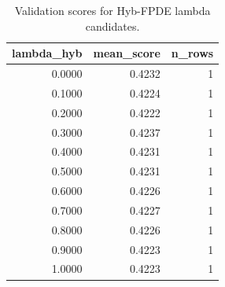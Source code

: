 \begin{table}[t]
\caption{Validation scores for Hyb-FPDE lambda candidates.}
\label{tab:lambda_distribution_computed}
\centering
\begin{tabular}{rrr}
\toprule
lambda\_hyb & mean\_score & n\_rows \\
\midrule
0.0000 & 0.4232 & 1 \\
0.1000 & 0.4224 & 1 \\
0.2000 & 0.4222 & 1 \\
0.3000 & 0.4237 & 1 \\
0.4000 & 0.4231 & 1 \\
0.5000 & 0.4231 & 1 \\
0.6000 & 0.4226 & 1 \\
0.7000 & 0.4227 & 1 \\
0.8000 & 0.4226 & 1 \\
0.9000 & 0.4223 & 1 \\
1.0000 & 0.4223 & 1 \\
\bottomrule
\end{tabular}

\end{table}
